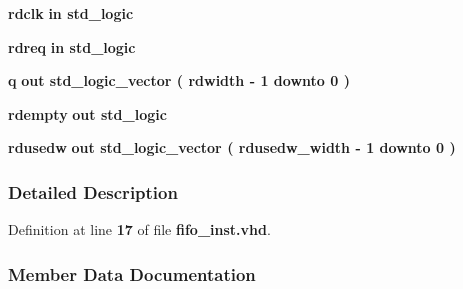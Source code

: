 \begin{DoxyCompactItemize}
{\bf rdclk}  {\bfseries {\bfseries \textcolor{keywordflow}{in}\textcolor{vhdlchar}{ }}} {\bfseries \textcolor{comment}{std\+\_\+logic}\textcolor{vhdlchar}{ }} 
\item 
{\bf rdreq}  {\bfseries {\bfseries \textcolor{keywordflow}{in}\textcolor{vhdlchar}{ }}} {\bfseries \textcolor{comment}{std\+\_\+logic}\textcolor{vhdlchar}{ }} 
\item 
{\bf q}  {\bfseries {\bfseries \textcolor{keywordflow}{out}\textcolor{vhdlchar}{ }}} {\bfseries \textcolor{comment}{std\+\_\+logic\+\_\+vector}\textcolor{vhdlchar}{ }\textcolor{vhdlchar}{(}\textcolor{vhdlchar}{ }\textcolor{vhdlchar}{ }\textcolor{vhdlchar}{ }\textcolor{vhdlchar}{ }{\bfseries {\bf rdwidth}} \textcolor{vhdlchar}{-\/}\textcolor{vhdlchar}{ } \textcolor{vhdldigit}{1} \textcolor{vhdlchar}{ }\textcolor{keywordflow}{downto}\textcolor{vhdlchar}{ }\textcolor{vhdlchar}{ } \textcolor{vhdldigit}{0} \textcolor{vhdlchar}{ }\textcolor{vhdlchar}{)}\textcolor{vhdlchar}{ }} 
\item 
{\bf rdempty}  {\bfseries {\bfseries \textcolor{keywordflow}{out}\textcolor{vhdlchar}{ }}} {\bfseries \textcolor{comment}{std\+\_\+logic}\textcolor{vhdlchar}{ }} 
\item 
{\bf rdusedw}  {\bfseries {\bfseries \textcolor{keywordflow}{out}\textcolor{vhdlchar}{ }}} {\bfseries \textcolor{comment}{std\+\_\+logic\+\_\+vector}\textcolor{vhdlchar}{ }\textcolor{vhdlchar}{(}\textcolor{vhdlchar}{ }\textcolor{vhdlchar}{ }\textcolor{vhdlchar}{ }\textcolor{vhdlchar}{ }{\bfseries {\bf rdusedw\+\_\+width}} \textcolor{vhdlchar}{-\/}\textcolor{vhdlchar}{ } \textcolor{vhdldigit}{1} \textcolor{vhdlchar}{ }\textcolor{keywordflow}{downto}\textcolor{vhdlchar}{ }\textcolor{vhdlchar}{ } \textcolor{vhdldigit}{0} \textcolor{vhdlchar}{ }\textcolor{vhdlchar}{)}\textcolor{vhdlchar}{ }} 
\end{DoxyCompactItemize}


\subsubsection{Detailed Description}


Definition at line {\bf 17} of file {\bf fifo\+\_\+inst.\+vhd}.



\subsubsection{Member Data Documentation}
